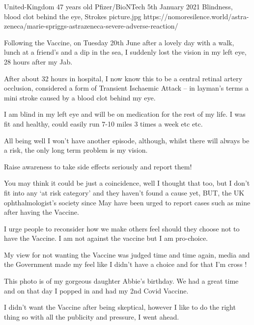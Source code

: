           {United-Kingdom}
          {47 years old}
          {Pfizer/BioNTech}
          {5th January 2021}
          {Blindness, blood clot behind the eye, Strokes}
          {picture.jpg}
          {https://nomoresilence.world/astra-zeneca/marie-spriggs-astrazeneca-severe-adverse-reaction/}
          {

Following the Vaccine, on Tuesday 20th June after a lovely day with a walk,
lunch at a friend’s and a dip in the sea, I suddenly lost the vision in my left
eye, 28 hours after my Jab.

After about 32 hours in hospital, I now know this to be a central retinal artery
occlusion, considered a form of Transient Ischaemic Attack – in layman’s terms a
mini stroke caused by a blood clot behind my eye.

I am blind in my left eye and will be on medication for the rest of my life. I
was fit and healthy, could easily run 7-10 miles 3 times a week etc etc.

All being well I won’t have another episode, although, whilst there will always
be a risk, the only long term problem is my vision.

Raise awareness to take side effects seriously and report them!

You may think it could be just a coincidence, well I thought that too, but I
don’t fit into any ‘at risk category’ and they haven’t found a cause yet, BUT,
the UK ophthalmologist’s society since May have been urged to report cases such
as mine after having the Vaccine.

I urge people to reconsider how we make others feel should they choose not to
have the Vaccine. I am not against the vaccine but I am pro-choice.

My view for not wanting the Vaccine was judged time and time again, media and
the Government made my feel like I didn’t have a choice and for that I’m cross !

This photo is of my gorgeous daughter Abbie’s birthday. We had a great time and
on that day I popped in and had my 2nd Covid Vaccine.

I didn’t want the Vaccine after being skeptical, however I like to do the right
thing so with all the publicity and pressure, I went ahead.

}
